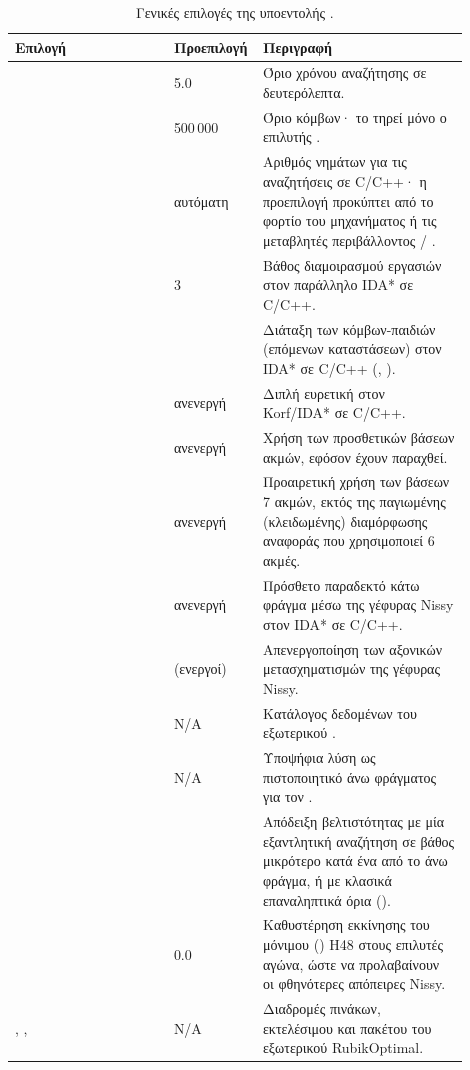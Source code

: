 \begin{table}[htbp]\centering
\small
\begin{tabular}{@{}L{0.34\linewidth}L{0.12\linewidth}L{0.44\linewidth}@{}}
\hline
Επιλογή & Προεπιλογή & Περιγραφή \\
\hline
{} & 5.0 & Όριο χρόνου αναζήτησης σε δευτερόλεπτα. \\
 & 500\,000 & Όριο κόμβων· το τηρεί μόνο ο επιλυτής . \\
 & αυτόματη & Αριθμός νημάτων για τις αναζητήσεις σε C/C++· η προεπιλογή προκύπτει από το φορτίο του μηχανήματος ή τις μεταβλητές περιβάλλοντος  / . \\
 & 3 & Βάθος διαμοιρασμού εργασιών στον παράλληλο IDA* σε C/C++. \\
 &  & Διάταξη των κόμβων-παιδιών (επόμενων καταστάσεων) στον IDA* σε C/C++ (, ). \\
 & ανενεργή & Διπλή ευρετική στον Korf/IDA* σε C/C++. \\
 & ανενεργή & Χρήση των προσθετικών βάσεων ακμών, εφόσον έχουν παραχθεί. \\
 & ανενεργή & Προαιρετική χρήση των βάσεων 7 ακμών, εκτός της παγιωμένης (κλειδωμένης) διαμόρφωσης αναφοράς που χρησιμοποιεί 6 ακμές. \\
 & ανενεργή & Πρόσθετο παραδεκτό κάτω φράγμα μέσω της γέφυρας Nissy στον IDA* σε C/C++. \\
\allowbreak{} & (ενεργοί) & Απενεργοποίηση των αξονικών μετασχηματισμών της γέφυρας Nissy. \\
 & N/A & Κατάλογος δεδομένων του εξωτερικού . \\
 & N/A & Υποψήφια λύση ως πιστοποιητικό άνω φράγματος για τον . \\
\allowbreak{} &  & Απόδειξη βελτιστότητας με μία εξαντλητική αναζήτηση σε βάθος μικρότερο κατά ένα από το άνω φράγμα, ή με κλασικά επαναληπτικά όρια (). \\
 & 0.0 & Καθυστέρηση εκκίνησης του μόνιμου () H48 στους επιλυτές αγώνα, ώστε να προλαβαίνουν οι φθηνότερες απόπειρες Nissy. \\
, \allowbreak{}, \allowbreak{} & N/A & Διαδρομές πινάκων, εκτελέσιμου και πακέτου του εξωτερικού RubikOptimal. \\
\hline
\end{tabular}
\caption{Γενικές επιλογές της υποεντολής .}
\label{tab:cli-solve}
\end{table}

